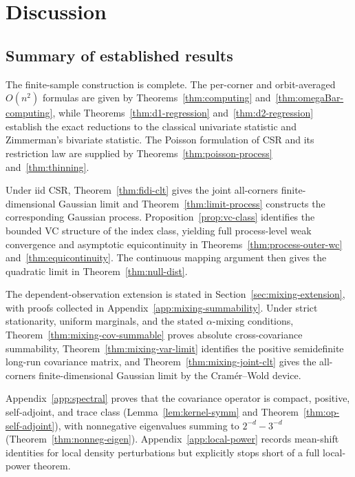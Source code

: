 \documentclass[pdflatex]{sn-jnl}
\theoremstyle{thmstyleone}
\theoremstyle{thmstyletwo}
\theoremstyle{thmstylethree}
\begin{document}
\section{Discussion}\label{sec:discussion}

\subsection{Summary of established results}

The finite-sample construction is complete. The per-corner and orbit-averaged $O(n^2)$ formulas are given by Theorems~\ref{thm:computing} and~\ref{thm:omegaBar-computing}, while Theorems~\ref{thm:d1-regression} and~\ref{thm:d2-regression} establish the exact reductions to the classical univariate statistic and Zimmerman's bivariate statistic. The Poisson formulation of CSR and its restriction law are supplied by Theorems~\ref{thm:poisson-process} and~\ref{thm:thinning}.

Under iid CSR, Theorem~\ref{thm:fidi-clt} gives the joint all-corners finite-dimensional Gaussian limit and Theorem~\ref{thm:limit-process} constructs the corresponding Gaussian process. Proposition~\ref{prop:vc-class} identifies the bounded VC structure of the index class, yielding full process-level weak convergence and asymptotic equicontinuity in Theorems~\ref{thm:process-outer-wc} and~\ref{thm:equicontinuity}. The continuous mapping argument then gives the quadratic limit in Theorem~\ref{thm:null-dist}.

The dependent-observation extension is stated in Section~\ref{sec:mixing-extension}, with proofs collected in Appendix~\ref{app:mixing-summability}. Under strict stationarity, uniform marginals, and the stated $\alpha$-mixing conditions, Theorem~\ref{thm:mixing-cov-summable} proves absolute cross-covariance summability, Theorem~\ref{thm:mixing-var-limit} identifies the positive semidefinite long-run covariance matrix, and Theorem~\ref{thm:mixing-joint-clt} gives the all-corners finite-dimensional Gaussian limit by the Cram\'er--Wold device.

Appendix~\ref{app:spectral} proves that the covariance operator is compact, positive, self-adjoint, and trace class (Lemma~\ref{lem:kernel-symm} and Theorem~\ref{thm:op-self-adjoint}), with nonnegative eigenvalues summing to $2^{-d}-3^{-d}$ (Theorem~\ref{thm:nonneg-eigen}). Appendix~\ref{app:local-power} records mean-shift identities for local density perturbations but explicitly stops short of a full local-power theorem.
\end{document}
